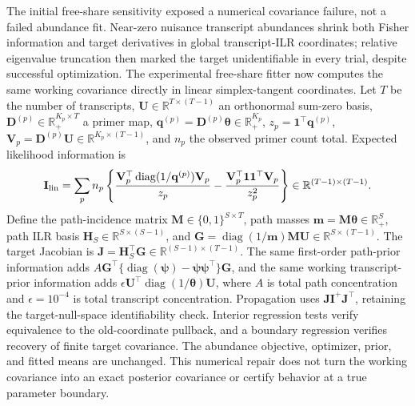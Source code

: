 \documentclass[11pt]{article}
\begin{document}
The initial free-share sensitivity exposed a numerical covariance failure, not a failed abundance fit. Near-zero nuisance transcript abundances shrink both Fisher information and target derivatives in global transcript-ILR coordinates; relative eigenvalue truncation then marked the target unidentifiable in every trial, despite successful optimization. The experimental free-share fitter now computes the same working covariance directly in linear simplex-tangent coordinates. Let \(T\) be the number of transcripts, \(\mathbf U\in\mathbb R^{T\times(T-1)}\) an orthonormal sum-zero basis, \(\mathbf D^{(p)}\in\mathbb R_+^{K_p\times T}\) a primer map, \(\mathbf q^{(p)}=\mathbf D^{(p)}\boldsymbol\theta\in\mathbb R_+^{K_p}\), \(z_p=\mathbf1^\top\mathbf q^{(p)}\), \(\mathbf V_p=\mathbf D^{(p)}\mathbf U\in\mathbb R^{K_p\times(T-1)}\), and \(n_p\) the observed primer count total. Expected likelihood information is \begin{equation}\mathbf I_{\rm lin}=\sum_p n_p\left\{\frac{\mathbf V_p^\top\operatorname{diag}(1/\mathbf q^{(p)})\mathbf V_p}{z_p}-\frac{\mathbf V_p^\top\mathbf1\mathbf1^\top\mathbf V_p}{z_p^2}\right\}\in\mathbb R^{(T-1)\times(T-1)}.\end{equation} Define the path-incidence matrix \(\mathbf M\in\{0,1\}^{S\times T}\), path masses \(\mathbf m=\mathbf M\boldsymbol\theta\in\mathbb R_+^S\), path ILR basis \(\mathbf H_S\in\mathbb R^{S\times(S-1)}\), and \(\mathbf G=\operatorname{diag}(1/\mathbf m)\mathbf M\mathbf U\in\mathbb R^{S\times(T-1)}\). The target Jacobian is \(\mathbf J=\mathbf H_S^\top\mathbf G\in\mathbb R^{(S-1)\times(T-1)}\). The same first-order path-prior information adds \(A\mathbf G^\top\{\operatorname{diag}(\boldsymbol\psi)-\boldsymbol\psi\boldsymbol\psi^\top\}\mathbf G\), and the same working transcript-prior information adds \(\epsilon\mathbf U^\top\operatorname{diag}(1/\boldsymbol\theta)\mathbf U\), where \(A\) is total path concentration and \(\epsilon=10^{-4}\) is total transcript concentration. Propagation uses \(\mathbf J\mathbf I^+\mathbf J^\top\), retaining the target-null-space identifiability check. Interior regression tests verify equivalence to the old-coordinate pullback, and a boundary regression verifies recovery of finite target covariance. The abundance objective, optimizer, prior, and fitted means are unchanged. This numerical repair does not turn the working covariance into an exact posterior covariance or certify behavior at a true parameter boundary.
\end{document}
